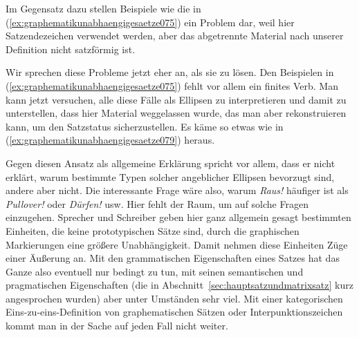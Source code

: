 Im Gegensatz dazu stellen Beispiele wie die in (\ref{ex:graphematikunabhaengigesaetze075}) ein Problem dar, weil hier Satzendezeichen verwendet werden, aber das abgetrennte Material nach unserer Definition nicht satzförmig ist.

\begin{exe}
  \ex\label{ex:graphematikunabhaengigesaetze075}
  \begin{xlist}
  \end{xlist}
\end{exe}

Wir sprechen diese Probleme jetzt eher an, als sie zu lösen.
Den Beispielen in (\ref{ex:graphematikunabhaengigesaetze075}) fehlt vor allem ein finites Verb.
Man kann jetzt versuchen, alle diese Fälle als Ellipsen zu interpretieren und damit zu unterstellen, dass hier Material weggelassen wurde, das man aber rekonstruieren kann, um den Satzstatus sicherzustellen.
Es käme so etwas wie in (\ref{ex:graphematikunabhaengigesaetze079}) heraus.

\begin{exe}
  \ex\label{ex:graphematikunabhaengigesaetze079}
  \begin{xlist}
  \end{xlist}
\end{exe}

Gegen diesen Ansatz als allgemeine Erklärung spricht vor allem, dass er nicht erklärt, warum bestimmte Typen solcher angeblicher Ellipsen bevorzugt sind, andere aber nicht.
Die interessante Frage wäre also, warum \textit{Raus!} häufiger ist als \textit{Pullover!} oder \textit{Dürfen!} usw.
Hier fehlt der Raum, um auf solche Fragen einzugehen.
Sprecher und Schreiber geben hier ganz allgemein gesagt bestimmten Einheiten, die keine prototypischen Sätze sind, durch die graphischen Markierungen eine größere Unabhängigkeit.
Damit nehmen diese Einheiten Züge einer Äußerung an.
Mit den grammatischen Eigenschaften eines Satzes hat das Ganze also eventuell nur bedingt zu tun, mit seinen semantischen und pragmatischen Eigenschaften (die in Abschnitt~\ref{sec:hauptsatzundmatrixsatz} kurz angesprochen wurden) aber unter Umständen sehr viel.
Mit einer kategorischen Eins-zu-eins-Definition von graphematischen Sätzen oder Interpunktionszeichen kommt man in der Sache auf jeden Fall nicht weiter.

